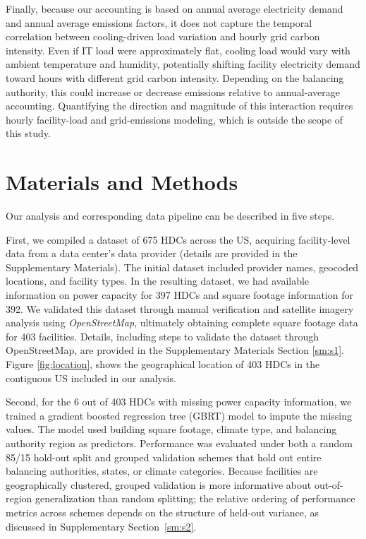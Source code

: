 \documentclass[12pt]{article}
\begin{document}
Finally, because our accounting is based on annual average electricity
demand and annual average emissions factors, it does not capture the
temporal correlation between cooling-driven load variation and hourly grid
carbon intensity. Even if IT load were approximately flat, cooling load would vary with ambient temperature and humidity, potentially shifting facility electricity demand toward hours with different grid carbon intensity. Depending on the balancing authority, this could increase or decrease emissions relative to annual-average accounting. Quantifying the direction and magnitude of this interaction requires hourly facility-load and grid-emissions modeling, which is outside the scope of this study.

\section*{Materials and Methods}

Our analysis and corresponding data pipeline can be described in five steps.

First, we compiled a dataset of 675 HDCs across the US, acquiring facility-level data from a data center's data provider (details are provided in the Supplementary Materials). The initial dataset included provider names, geocoded locations, and facility types. In the resulting dataset, we had available information on power capacity for 397 HDCs and square footage information for 392. We validated this dataset through manual verification and satellite imagery analysis using \textit{OpenStreetMap}, ultimately obtaining complete square footage data for 403 facilities. Details, including steps to validate the dataset through OpenStreetMap, are provided in the Supplementary Materials Section \ref{sm:s1}. Figure \ref{fig:location}, shows the geographical location of 403 HDCs in the contiguous US included in our analysis. %

Second, for the 6 out of 403 HDCs with missing power capacity information, we trained a gradient boosted regression tree (GBRT) model \cite{prettenhofer2014gradient} to impute the missing values. The model used building square footage, climate type, and balancing authority region as predictors. 
Performance was evaluated under both a random 85/15 hold-out split and grouped validation schemes that hold out entire balancing authorities, states, or climate categories. Because facilities are geographically clustered, grouped validation is more informative about out-of-region generalization than random splitting; the relative ordering of performance metrics across schemes depends on the structure of held-out variance, as discussed in Supplementary Section~\ref{sm:s2}.
\end{document}

